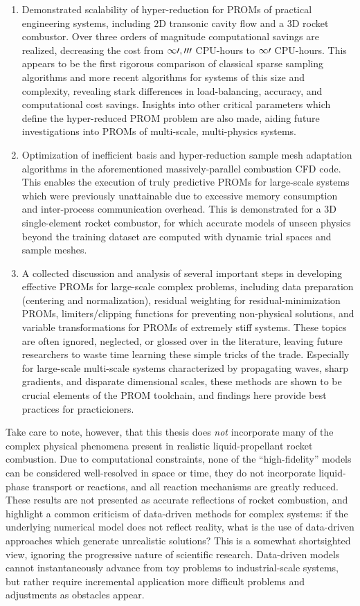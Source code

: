 \begin{enumerate}
    \item Demonstrated scalability of hyper-reduction for PROMs of practical engineering systems, including 2D transonic cavity flow and a 3D rocket combustor. Over three orders of magnitude computational savings are realized, decreasing the cost from $\mathcal{10,000}$ CPU-hours to $\mathcal{10}$ CPU-hours. This appears to be the first rigorous comparison of classical sparse sampling algorithms and more recent algorithms for systems of this size and complexity, revealing stark differences in load-balancing, accuracy, and computational cost savings. Insights into other critical parameters which define the hyper-reduced PROM problem are also made, aiding future investigations into PROMs of multi-scale, multi-physics systems.
    \item Optimization of inefficient basis and hyper-reduction sample mesh adaptation algorithms in the aforementioned massively-parallel combustion CFD code. This enables the execution of truly predictive PROMs for large-scale systems which were previously unattainable due to excessive memory consumption and inter-process communication overhead. This is demonstrated for a 3D single-element rocket combustor, for which accurate models of unseen physics beyond the training dataset are computed with dynamic trial spaces and sample meshes.
    \item A collected discussion and analysis of several important steps in developing effective PROMs for large-scale complex problems, including data preparation (centering and normalization), residual weighting for residual-minimization PROMs, limiters/clipping functions for preventing non-physical solutions, and variable transformations for PROMs of extremely stiff systems. These topics are often ignored, neglected, or glossed over in the literature, leaving future researchers to waste time learning these simple tricks of the trade. Especially for large-scale multi-scale systems characterized by propagating waves, sharp gradients, and disparate dimensional scales, these methods are shown to be crucial elements of the PROM toolchain, and findings here provide best practices for practicioners. 
\end{enumerate}

Take care to note, however, that this thesis does \textit{not} incorporate many of the complex physical phenomena present in realistic liquid-propellant rocket combustion. Due to computational constraints, none of the ``high-fidelity'' models can be considered well-resolved in space or time, they do not incorporate liquid-phase transport or reactions, and all reaction mechanisms are greatly reduced. These results are not presented as accurate reflections of rocket combustion, and highlight a common criticism of data-driven methods for complex systems: if the underlying numerical model does not reflect reality, what is the use of data-driven approaches which generate unrealistic solutions? This is a somewhat shortsighted view, ignoring the progressive nature of scientific research. Data-driven models cannot instantaneously advance from toy problems to industrial-scale systems, but rather require incremental application more difficult problems and adjustments as obstacles appear. 

